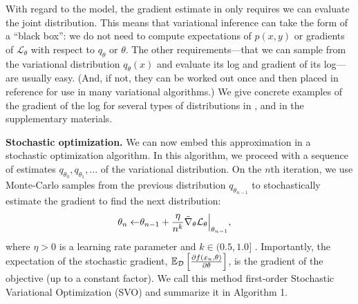 


With regard to the model, the gradient estimate in 
only requires we can evaluate the joint distribution.  This means that
variational inference can take the form of a ``black box'': we do not
need to compute expectations of $p(x, y)$ or gradients of
$\mathcal{L}_\theta$ with respect to $q_\theta$ or $\theta$.  The
other requirements---that we can sample from the variational
distribution $q_\theta(x)$ and evaluate its log and gradient of its
log---are usually easy.  (And, if not, they can be worked out once and
then placed in reference for use in many variational algorithms.)  We
give concrete examples of the gradient of the log for several types of
distributions in ,  and
in the supplementary materials.



\textbf{Stochastic optimization.}  We can now embed this approximation
in a stochastic optimization algorithm.  In this algorithm, we proceed
with a sequence of estimates $q_{\theta_0}, q_{\theta_1}, \ldots$ of
the variational distribution. On the $n$th iteration, we use
Monte-Carlo samples from the previous distribution $q_{\theta_{n-1}}$
to stochastically estimate the gradient to find the next
distribution:
\begin{align}
  \label{equation:svo_update}
  \theta_n \gets & \theta_{n-1} +
  \frac{\eta}{n^k} {\tilde \nabla_{  \theta }{ \mathcal{L}_\theta }} \Bigr|_{\theta_{n-1}},
\end{align}
where $\eta > 0$ is a learning rate parameter and $k \in (0.5, 1.0]$
  \cite{carbonetto:2009}. Importantly, the expectation of the
  stochastic gradient, $\mathbb{E}_{\mathcal{D}}\left[\frac{\partial f(x_n, \theta)}{\partial \theta}\right]$, is
  the gradient of the objective (up to a constant factor).
We call this method first-order Stochastic Variational Optimization
(SVO) and summarize it in Algorithm 1. %

